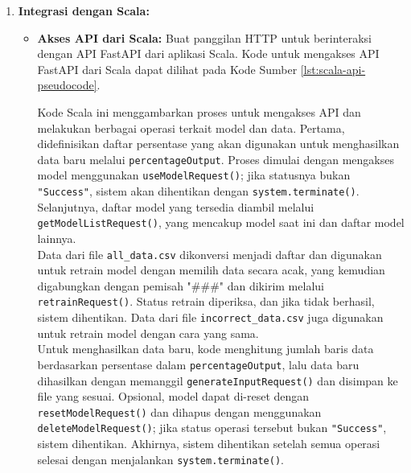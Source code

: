 \begin{enumerate}[topsep=0pt]
  \item \textbf{Integrasi dengan Scala:}
  \begin{itemize}
      \item \textbf{Akses API dari Scala:} Buat panggilan HTTP untuk berinteraksi dengan API FastAPI dari aplikasi Scala.
      Kode untuk mengakses API FastAPI dari Scala dapat dilihat pada Kode Sumber \ref{lst:scala-api-pseudocode}.

      

      Kode Scala ini menggambarkan proses untuk mengakses API dan melakukan berbagai operasi terkait model dan data. Pertama, didefinisikan daftar persentase yang akan digunakan untuk menghasilkan data baru melalui \texttt{percentageOutput}. Proses dimulai dengan mengakses model menggunakan \texttt{useModelRequest()}; jika statusnya bukan \texttt{"Success"}, sistem akan dihentikan dengan \texttt{system.terminate()}. Selanjutnya, daftar model yang tersedia diambil melalui \texttt{getModelListRequest()}, yang mencakup model saat ini dan daftar model lainnya. 
      \\

      Data dari file \texttt{all\_data.csv} dikonversi menjadi daftar dan digunakan untuk retrain model dengan memilih data secara acak, yang kemudian digabungkan dengan pemisah "\#\#\#" dan dikirim melalui \texttt{retrainRequest()}. Status retrain diperiksa, dan jika tidak berhasil, sistem dihentikan. Data dari file \texttt{incorrect\_data.csv} juga digunakan untuk retrain model dengan cara yang sama. 
      \\
      
      Untuk menghasilkan data baru, kode menghitung jumlah baris data berdasarkan persentase dalam \texttt{percentageOutput}, lalu data baru dihasilkan dengan memanggil \texttt{generateInputRequest()} dan disimpan ke file yang sesuai. Opsional, model dapat di-reset dengan \texttt{resetModelRequest()} dan dihapus dengan menggunakan \texttt{deleteModelRequest()}; jika status operasi tersebut bukan \texttt{"Success"}, sistem dihentikan. Akhirnya, sistem dihentikan setelah semua operasi selesai dengan menjalankan \texttt{system.terminate()}.

      
  \end{itemize}
\end{enumerate}


